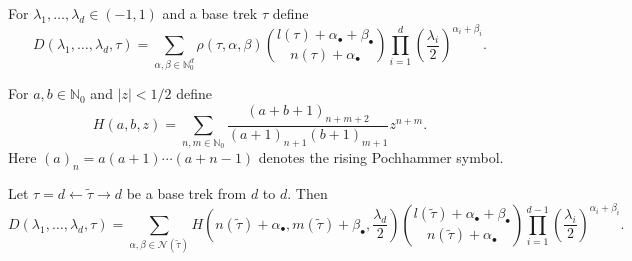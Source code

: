 \documentclass[10pt,a4paper]{amsart}
\begin{document}
\begin{definition} \label{dfn:D} For $\lambda_1, \ldots, \lambda_d \in (-1, 1)$ and a 
    base trek $\tau$ define
    \begin{equation} \label{eq:genD}
    D(\lambda_1, \ldots, \lambda_d, \tau) = \sum_{\alpha, \beta \in \mathbb{N}_0^d}
    \rho(\tau, \alpha, \beta)
    {l(\tau) + \alpha_{\bullet} + \beta_{\bullet} \choose n(\tau) + \alpha_{\bullet}} 
    \prod_{i=1}^d \left(\frac{\lambda_i}{2}\right)^{\alpha_i + \beta_i}.
    \end{equation}
\end{definition}

\begin{definition} For $a,b \in \mathbb{N}_0$ and $|z| < 1/2$  
    define
    \begin{equation}
            \label{eq:Hdef}
        H(a, b, z) = \sum_{n, m \in \mathbb{N}_0}
        \frac{(a + b + 1)_{n + m + 2}}{(a + 1)_{n + 1}(b + 1)_{m + 1}}
        z^{n + m}.
    \end{equation}
    Here $(a)_n = a(a+1)\cdots(a + n - 1)$ denotes the rising Pochhammer symbol.
\end{definition}

\begin{proposition} \label{prop:Drep}
    Let $\tau = d \leftarrow \tilde{\tau} \rightarrow d$ be a base trek from 
    $d$ to $d$. Then
    {\small
    \begin{equation*}
        D(\lambda_1, \ldots, \lambda_{d}, \tau)  
        = \sum_{\alpha, \beta \in \mathcal{N}(\tilde{\tau})} 
        H\left(n(\tilde{\tau}) + \alpha_{\bullet}, m(\tilde{\tau}) + \beta_{\bullet}, \frac{\lambda_d}{2}\right) 
        {l(\tilde{\tau}) + \alpha_{\bullet} + \beta_{\bullet}
        \choose n(\tilde{\tau}) + \alpha_{\bullet}}
        \prod_{i=1}^{d-1} \left(\frac{\lambda_i}{2}\right)^{\alpha_i + \beta_i}. 
    \end{equation*}
    }
\end{proposition}
\end{document}
